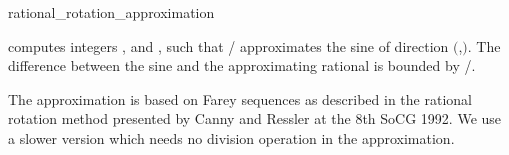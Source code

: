 \begin{ccRefFunction}{rational_rotation_approximation}

{computes integers ,  and , such
that / approximates the sine of direction 
$($,$)$. The difference between the sine and
the approximating rational is bounded by /.
}

\ccImplementation
The approximation is based on Farey sequences as described in
the rational rotation method presented by Canny and Ressler at the 
8th SoCG 1992. We use a slower version which needs no division operation 
in the approximation.

\ccSeeAlso
{}

\end{ccRefFunction}

